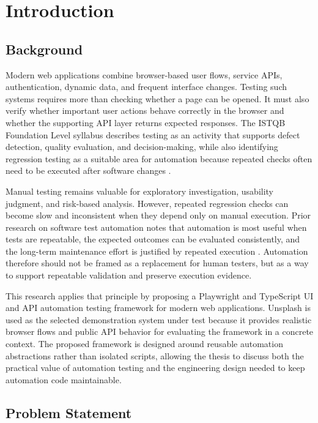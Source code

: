 \chapter{Introduction}
\label{ch:introduction}

\section{Background}
\label{sec:ch1-background}

Modern web applications combine browser-based user flows, service APIs, authentication, dynamic data, and frequent interface changes. Testing such systems requires more than checking whether a page can be opened. It must also verify whether important user actions behave correctly in the browser and whether the supporting API layer returns expected responses. The ISTQB Foundation Level syllabus describes testing as an activity that supports defect detection, quality evaluation, and decision-making, while also identifying regression testing as a suitable area for automation because repeated checks often need to be executed after software changes \autocite{istqb_ctfl_syllabus_2024}.

Manual testing remains valuable for exploratory investigation, usability judgment, and risk-based analysis. However, repeated regression checks can become slow and inconsistent when they depend only on manual execution. Prior research on software test automation notes that automation is most useful when tests are repeatable, the expected outcomes can be evaluated consistently, and the long-term maintenance effort is justified by repeated execution \autocite{garousi_mantyla_automation_2016}. Automation therefore should not be framed as a replacement for human testers, but as a way to support repeatable validation and preserve execution evidence.

This research applies that principle by proposing a Playwright and TypeScript UI and API automation testing framework for modern web applications. Unsplash is used as the selected demonstration system under test because it provides realistic browser flows and public API behavior for evaluating the framework in a concrete context. The proposed framework is designed around reusable automation abstractions rather than isolated scripts, allowing the thesis to discuss both the practical value of automation testing and the engineering design needed to keep automation code maintainable.

\section{Problem Statement}
\label{sec:ch1-problem-statement}

